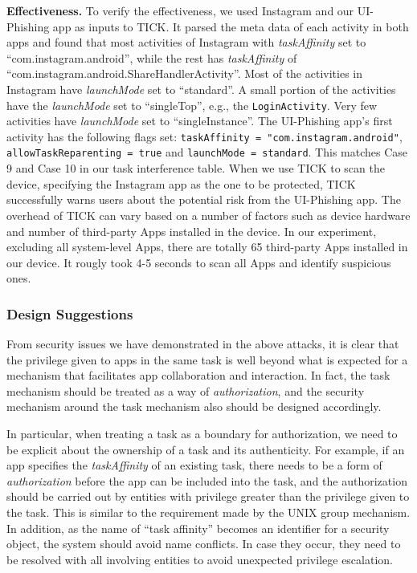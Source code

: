 \documentclass[letterpaper,12pt]{article}
\begin{document}
\textbf{Effectiveness.} To verify the effectiveness, we used Instagram and our UI-Phishing app
as inputs to TICK. It parsed the meta data of each activity in both
apps and found that most activities of Instagram with {\em
  taskAffinity} set to ``com.instagram.android'', while the rest has
{\em taskAffinity} of
``com.instagram.android.ShareHandlerActivity''. Most of the activities
in Instagram have {\em launchMode} set to ``standard''. A small
portion of the activities have the {\em launchMode} set to
``singleTop'', e.g., the \texttt{LoginActivity}. Very few activities
have {\em launchMode} set to ``singleInstance''. The UI-Phishing app's
first activity has the following flags set: \texttt{taskAffinity =
  "com.instagram.android"}, \texttt{allowTaskReparenting = true} and
\texttt{launchMode = standard}. This matches Case 9 and Case 10 in our
task interference table. When we use TICK to scan the device,
specifying the Instagram app as the one to be protected, TICK
successfully warns users about the potential risk from the UI-Phishing
app. The overhead of TICK can vary based on a number of factors such as device hardware and number of third-party Apps installed in the device. In our experiment, excluding all system-level Apps, there are totally 65 third-party Apps installed in our device. It rougly took 4-5 seconds to scan all Apps and identify suspicious ones.

\subsubsection{Design Suggestions}

From security issues we have demonstrated in the above attacks, it is
clear that the privilege given to apps in the same task is well beyond
what is expected for a mechanism that facilitates app collaboration
and interaction. In fact, the task mechanism should be treated as a
way of {\em authorization}, and the security mechanism around the task
mechanism also should be designed accordingly.

In particular, when treating a task as a boundary for authorization,
we need to be explicit about the ownership of a task and its
authenticity. For example, if an app specifies the {\em taskAffinity}
of an existing task, there needs to be a form of {\em authorization}
before the app can be included into the task, and the authorization
should be carried out by entities with privilege greater than the
privilege given to the task. This is similar to the requirement made
by the UNIX group mechanism. In addition, as the name of ``task affinity''
becomes an identifier for a security object, the system should avoid
name conflicts. In case they occur, they need to be resolved with all
involving entities to avoid unexpected privilege escalation.
\end{document}
